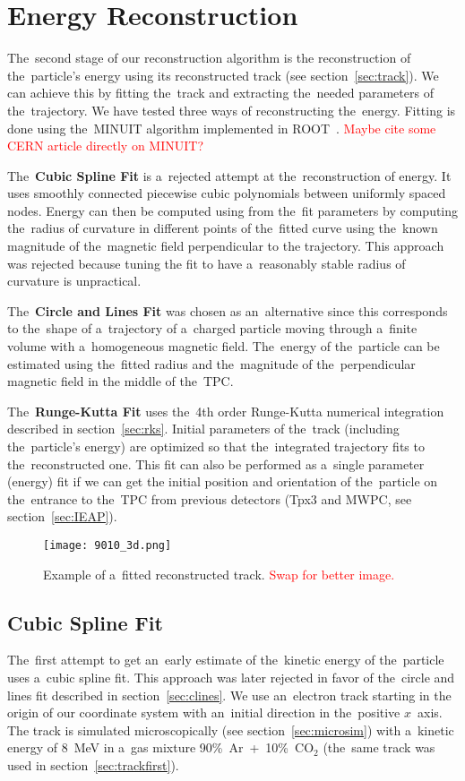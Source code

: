 \chapter{Energy Reconstruction}
\label{sec:energy}
	The~second stage of our reconstruction algorithm is the reconstruction of the~particle's energy using its reconstructed track (see section~\ref{sec:track}). We can achieve this by fitting the~track and extracting the~needed parameters of the~trajectory. We have tested three ways of reconstructing the~energy. Fitting is done using the~MINUIT algorithm implemented in ROOT~\cite{ROOT}. \textcolor{red}{Maybe cite some CERN article directly on MINUIT?}
	
	The~\textbf{Cubic Spline Fit} is a~rejected attempt at the~reconstruction of energy. It uses smoothly connected piecewise cubic polynomials between uniformly spaced nodes. Energy can then be computed using from the~fit parameters by computing the~radius of curvature in different points of the~fitted curve using the~known magnitude of the~magnetic field perpendicular to the trajectory. This approach was rejected because tuning the fit to have a~reasonably stable radius of curvature is unpractical.
	
	The~\textbf{Circle and Lines Fit} was chosen as an~alternative since this corresponds to the~shape of a~trajectory of a~charged particle moving through a~finite volume with a~homogeneous magnetic field. The~energy of the~particle can be estimated using the~fitted radius and the~magnitude of the~perpendicular magnetic field in the middle of the~\ac{TPC}.
	
	The~\textbf{Runge-Kutta Fit} uses the~4th order Runge-Kutta numerical integration described in section~\ref{sec:rks}. Initial parameters of the~track (including the~particle's energy) are optimized so that the~integrated trajectory fits to the~reconstructed one. This fit can also be performed as a~single parameter (energy) fit if we can get the initial position and orientation of the~particle on the~entrance to the~\ac{TPC} from previous detectors (\ac{Tpx3} and \ac{MWPC}, see section~\ref{sec:IEAP}).
	
	\begin{figure}
		\centering
		\texttt{[image: 9010\_3d.png]}
		\caption{Example of a~fitted reconstructed track. \textcolor{red}{Swap for better image.}}
		\label{fig:90103d}
	\end{figure}
	
	\section{Cubic Spline Fit}
		The~first attempt to get an~early estimate of the~kinetic energy of the~particle uses a~cubic spline fit. This approach was later rejected in favor of the~circle and lines fit described in section~\ref{sec:clines}. We use an~electron track starting in the origin of our coordinate system with an~initial direction in the~positive $x$~axis. The track is simulated microscopically (see section~\ref{sec:microsim}) with a~kinetic energy of 8~MeV in a~gas mixture 90\%~Ar~+~10\%~CO$_2$ (the~same track was used in section~\ref{sec:trackfirst}).
				
